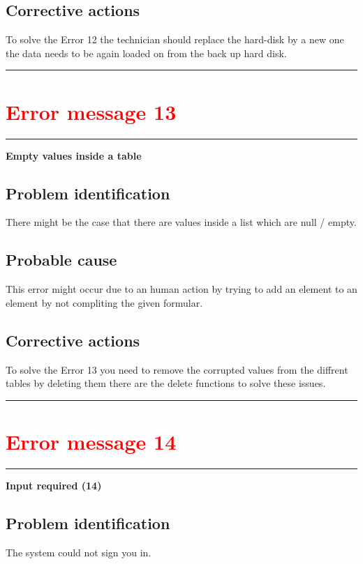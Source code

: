 \subsection{Corrective actions}
To solve the Error 12 the technician should replace the hard-disk by a new one
the data needs to be again loaded on from the back up hard disk.

\vspace{0.5cm}
\hrule



 

\section{{\textbf{\textcolor{red}{Error message 13}}}}
\hrule
\vspace{0.5cm}
\textbf{Empty values inside a table}

\subsection{Problem identification}
There might be the case that there are values inside a list which are null /
empty.

\subsection{Probable cause}
This error might occur due to an human action by trying to add an element to an
element by not compliting the given formular.

\subsection{Corrective actions}
To solve the Error 13 you need to remove the corrupted values from the diffrent
tables by deleting them there are the delete functions to solve these issues.

\vspace{0.5cm}
\hrule






\section{{\textbf{\textcolor{red}{Error message 14}}}}
\hrule
\vspace{0.5cm}
\textbf{Input required (14)}
\subsection{Problem identification}
The system could not sign you in.

